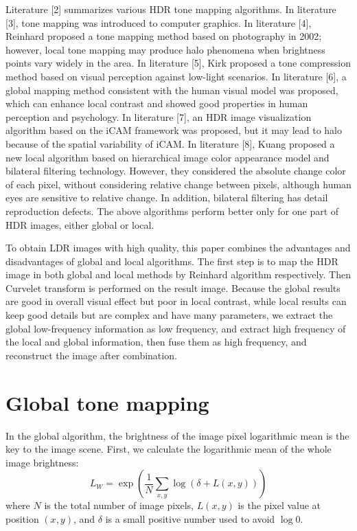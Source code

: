 \documentclass[11pt]{article}
\begin{document}
Literature [2] summarizes various HDR tone mapping algorithms. In literature [3], tone mapping was introduced to computer graphics. In literature [4], Reinhard proposed a tone mapping method based on photography in 2002; however, local tone mapping may produce halo phenomena when brightness points vary widely in the area. In literature [5], Kirk proposed a tone compression method based on visual perception against low-light scenarios. In literature [6], a global mapping method consistent with the human visual model was proposed, which can enhance local contrast and showed good properties in human perception and psychology. In literature [7], an HDR image visualization algorithm based on the iCAM framework was proposed, but it may lead to halo because of the spatial variability of iCAM. In literature [8], Kuang proposed a new local algorithm based on hierarchical image color appearance model and bilateral filtering technology. However, they considered the absolute change color of each pixel, without considering relative change between pixels, although human eyes are sensitive to relative change. In addition, bilateral filtering has detail reproduction defects. The above algorithms perform better only for one part of HDR images, either global or local.

To obtain LDR images with high quality, this paper combines the advantages and disadvantages of global and local algorithms. The first step is to map the HDR image in both global and local methods by Reinhard algorithm respectively. Then Curvelet transform is performed on the result image. Because the global results are good in overall visual effect but poor in local contrast, while local results can keep good details but are complex and have many parameters, we extract the global low-frequency information as low frequency, and extract high frequency of the local and global information, then fuse them as high frequency, and reconstruct the image after combination.

\section{Global tone mapping}

In the global algorithm, the brightness of the image pixel logarithmic mean is the key to the image scene. First, we calculate the logarithmic mean of the whole image brightness:
\begin{equation}
L_W = \exp\left(\frac{1}{N}\sum_{x,y}\log\left(\delta + L(x,y)\right)\right)
\end{equation}
where $N$ is the total number of image pixels, $L(x,y)$ is the pixel value at position $(x,y)$, and $\delta$ is a small positive number used to avoid $\log 0$.
\end{document}
